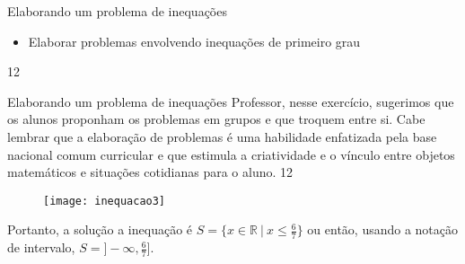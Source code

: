 \clearmargin
\begin{objectives}{Elaborando um problema de inequações}
{
\begin{itemize}
\item Elaborar problemas envolvendo inequações de primeiro grau
\end{itemize}
}{1}{2}
\end{objectives}
\begin{sugestions}{Elaborando um problema de inequações}
{
Professor, nesse exercício, sugerimos que os alunos proponham os problemas em grupos e que troquem entre si. Cabe lembrar que a elaboração de problemas é uma habilidade enfatizada pela base nacional comum curricular e que estimula a criatividade e o vínculo entre objetos matemáticos e situações cotidianas para o aluno.
}{1}{2}
\end{sugestions}



\begin{figure}[H]
\centering
\noindent\texttt{[image: inequacao3]}
\end{figure}

Portanto, a solução a inequação é $S = \{x \in \mathbb{R} \ | \ x \leq \frac{6}{7}\}$ ou então, usando a notação de intervalo, $S = ]-\infty, \frac{6}{7}]$.

\label{\detokenize{AF107-7:inequacoes-grau1}}\label{\detokenize{AF107-7::doc}}

